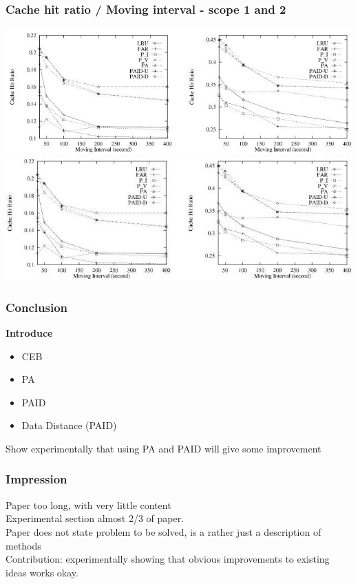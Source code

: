 \begin{frame}
\frametitle{Cache hit ratio / Moving interval - scope 1 and 2}

\includegraphics[scale=0.5]{images/fig8.jpg}\\
\includegraphics[scale=0.5]{images/fig9.jpg}

\end{frame}


\begin{frame}
\frametitle{Conclusion}
\Large

\textbf{Introduce}
\begin{itemize}
\item CEB
\item PA
\item PAID
\item Data Distance (PAID)
\end{itemize}

Show experimentally that using PA and PAID will give some improvement


\end{frame}

\begin{frame}
\frametitle{Impression}

Paper too long, with very little content\\
\vspace{1em}
Experimental section almost 2/3 of paper.\\
\vspace{1em}
Paper does not state problem to be solved, is a rather just a description of methods\\
\vspace{1em}
Contribution: experimentally showing that obvious improvements to existing ideas works okay.


\end{frame}